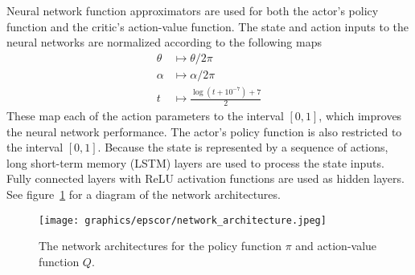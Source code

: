\documentclass{article}
\begin{document}
Neural network function approximators are used for both the actor's policy function and the critic's action-value function. The state and action inputs to the neural networks are normalized according to the following maps
\begin{align}
    \theta &\mapsto \theta / 2\pi \\
    \alpha &\mapsto \alpha / 2\pi \\
    t      &\mapsto \frac{\log(t + 10^{-7}) + 7}{2}
\end{align}
These map each of the action parameters to the interval $[0,1]$, which improves the neural network performance. The actor's policy function is also restricted to the interval $[0,1]$.
Because the state is represented by a sequence of actions, long short-term memory (LSTM) layers are used to process the state inputs\cite{lstm}. Fully connected layers with ReLU activation functions are used as hidden layers. See figure~\ref{fig:network-architecture} for a diagram of the network architectures.

\begin{figure}[ht]
    \centering
    \texttt{[image: graphics/epscor/network\_architecture.jpeg]}
    \caption{The network architectures for the policy function $\pi$ and action-value function $Q$.}
    \label{fig:network-architecture}
\end{figure}
\end{document}
